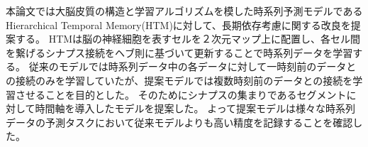 \abstract
本論文では大脳皮質の構造と学習アルゴリズムを模した時系列予測モデルであるHierarchical Temporal Memory(HTM)に対して、長期依存考慮に関する改良を提案する。
HTMは脳の神経細胞を表すセルを２次元マップ上に配置し、各セル間を繋げるシナプス接続をヘブ則に基づいて更新することで時系列データを学習する。
従来のモデルでは時系列データ中の各データに対して一時刻前のデータとの接続のみを学習していたが、提案モデルでは複数時刻前のデータとの接続を学習させることを目的とした。
そのためにシナプスの集まりであるセグメントに対して時間軸を導入したモデルを提案した。
よって提案モデルは様々な時系列データの予測タスクにおいて従来モデルよりも高い精度を記録することを確認した。
